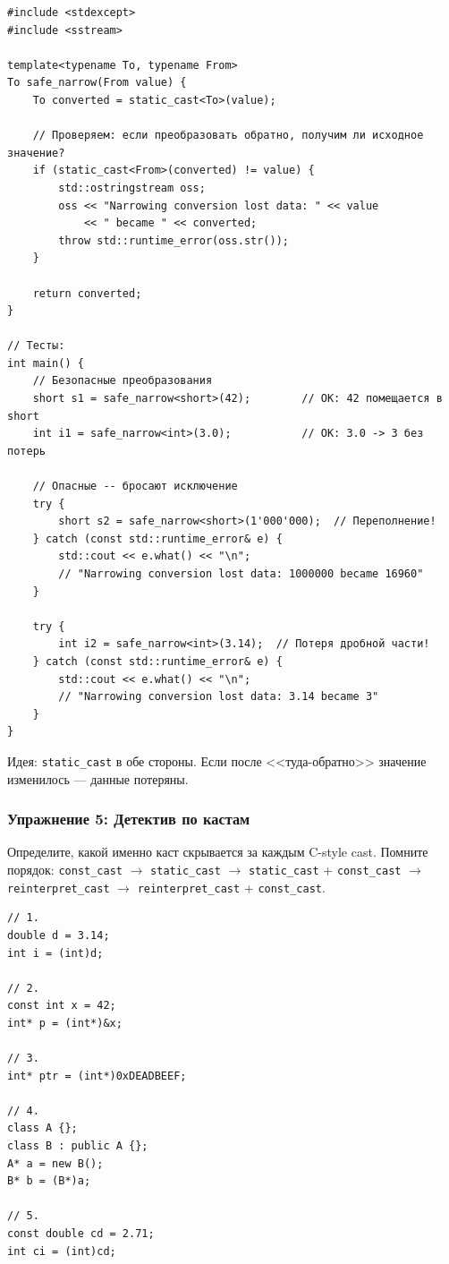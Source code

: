 \documentclass[a4paper,12pt]{article}
\begin{document}
\begin{lstlisting}
#include <stdexcept>
#include <sstream>

template<typename To, typename From>
To safe_narrow(From value) {
    To converted = static_cast<To>(value);

    // Проверяем: если преобразовать обратно, получим ли исходное значение?
    if (static_cast<From>(converted) != value) {
        std::ostringstream oss;
        oss << "Narrowing conversion lost data: " << value
            << " became " << converted;
        throw std::runtime_error(oss.str());
    }

    return converted;
}

// Тесты:
int main() {
    // Безопасные преобразования
    short s1 = safe_narrow<short>(42);        // OK: 42 помещается в short
    int i1 = safe_narrow<int>(3.0);           // OK: 3.0 -> 3 без потерь

    // Опасные -- бросают исключение
    try {
        short s2 = safe_narrow<short>(1'000'000);  // Переполнение!
    } catch (const std::runtime_error& e) {
        std::cout << e.what() << "\n";
        // "Narrowing conversion lost data: 1000000 became 16960"
    }

    try {
        int i2 = safe_narrow<int>(3.14);  // Потеря дробной части!
    } catch (const std::runtime_error& e) {
        std::cout << e.what() << "\n";
        // "Narrowing conversion lost data: 3.14 became 3"
    }
}
\end{lstlisting}

Идея: \texttt{static\_cast} в обе стороны. Если после <<туда-обратно>> значение
изменилось --- данные потеряны.

\subsubsection{Упражнение 5: Детектив по кастам}

Определите, какой именно каст скрывается за каждым C-style cast. Помните порядок:
\texttt{const\_cast} $\to$ \texttt{static\_cast} $\to$ \texttt{static\_cast} +
\texttt{const\_cast} $\to$ \texttt{reinterpret\_cast} $\to$ \texttt{reinterpret\_cast} +
\texttt{const\_cast}.

\begin{lstlisting}
// 1.
double d = 3.14;
int i = (int)d;

// 2.
const int x = 42;
int* p = (int*)&x;

// 3.
int* ptr = (int*)0xDEADBEEF;

// 4.
class A {};
class B : public A {};
A* a = new B();
B* b = (B*)a;

// 5.
const double cd = 2.71;
int ci = (int)cd;
\end{lstlisting}
\end{document}
